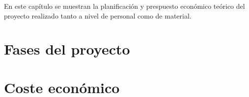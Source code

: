 En este capítulo se muestran la planificación y prespuesto económico teórico del proyecto realizado tanto a nivel de personal como de material.

\section{Fases del proyecto}

\section{Coste económico}
